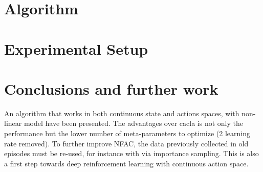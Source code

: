 \documentclass{style/esannV2}
\begin{document}


\section{Algorithm}



\section{Experimental Setup}



\section{Conclusions and further work}
An algorithm that works in both continuous state and actions spaces, 
with non-linear model have been presented.
The advantages over cacla is not only the performance but the lower 
number of meta-parameters to optimize (2 learning rate removed).
To further improve NFAC, the data previously collected in old episodes must be re-used, for instance with via importance sampling.
This is also a first step towards deep reinforcement learning with continuous action space.


\end{document}
